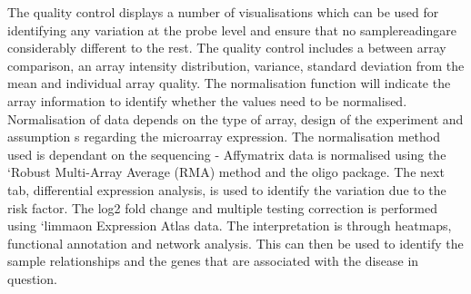 \documentclass{bioinfo}
\begin{document}
The quality control displays a number of visualisations which can be used for identifying any variation at the probe level and ensure that no sample\textquotesingles reading\textquotesingles are considerably different to the rest. The quality control includes a between array comparison, an array intensity distribution, variance, standard deviation from the mean and individual array quality. The normalisation function will indicate the array information to identify whether the values need to be normalised. Normalisation of data depends on the type of array, design of the experiment and assumption s regarding the microarray expression. The normalisation method used is dependant on the sequencing - Affymatrix data is normalised using the ‘Robust Multi-Array Average (RMA) method and the oligo package. The next tab, differential expression analysis, is used to identify the variation due to the risk factor. The log2 fold change and multiple testing correction is performed using ‘limma\textquotesingle on Expression Atlas data. The interpretation is through heatmaps, functional annotation and network analysis. This can then be used to identify the sample relationships and the genes that are associated with the disease in question.
\end{document}
